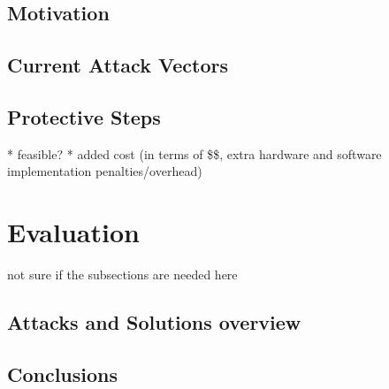 \documentclass[12pt,a4paper,twocolumn]{article}
\begin{document}
	\subsection{Motivation}
	\subsection{Current Attack Vectors}
	\subsection{Protective Steps}
		* feasible? 
		* added cost (in terms of \$\$, extra hardware and software implementation penalties/overhead)
	

\section{Evaluation}
\label{sec:conclusion}
	not sure if the subsections are needed here
	\subsection{Attacks and Solutions overview}
	\subsection{Conclusions}
	
	\pagebreak
	\onecolumn
	
		
	
\end{document}

